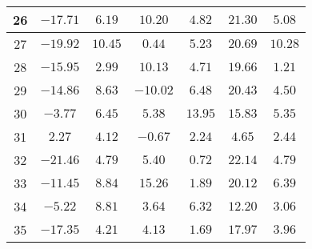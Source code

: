 \begin{table}[H]
\begin{tabular}{|c|c|c|c|c|c|c|}
                    26     & $-17.71$    &$6.19$   &  $10.20$  & $4.82$   & $21.30$  & $5.08$  \\ \hline
                    27     & $-19.92$    &$10.45$  &  $0.44$   & $5.23$   & $20.69$  & $10.28$ \\ \hline
                    28     & $-15.95$    &$2.99$   &  $10.13$  & $4.71$   & $19.66$  & $1.21$  \\ \hline
                    29     & $-14.86$    &$8.63$   &  $-10.02$ & $6.48$   & $20.43$  & $4.50$  \\ \hline
                    30     & $-3.77$     &$6.45$   &  $5.38$   & $13.95$  & $15.83$  & $5.35$  \\ \hline
                    31     & $2.27$      &$4.12$   &  $-0.67$  & $2.24$   & $4.65$   & $2.44$  \\ \hline
                    32     & $-21.46$    &$4.79$   &  $5.40$   & $0.72$   & $22.14$  & $4.79$  \\ \hline
                    33     & $-11.45$    &$8.84$   &  $15.26$  & $1.89$   & $20.12$  & $6.39$  \\ \hline
                    34     & $-5.22$     &$8.81$   &  $3.64$   & $6.32$   & $12.20$  & $3.06$  \\ \hline
                    35     & $-17.35$    &$4.21$   &  $4.13$   & $1.69$   & $17.97$  & $3.96$  \\ \hline
    \end{tabular}
    \label{tab:media_fisica_6_vertical}
\end{table}

